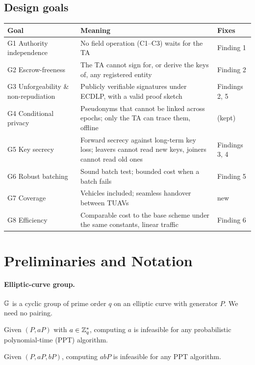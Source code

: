\subsection{Design goals}
\begin{center}\small
\begin{tabularx}{\linewidth}{@{}l>{\raggedright\arraybackslash}X l@{}}
\toprule
Goal & Meaning & Fixes\\
\midrule
G1 Authority independence & No field operation (C1--C3) waits for the TA & Finding 1\\
G2 Escrow-freeness & The TA cannot sign for, or derive the keys of, any registered entity & Finding 2\\
G3 Unforgeability \& non-repudiation & Publicly verifiable signatures under ECDLP, with a valid proof sketch & Findings 2, 5\\
G4 Conditional privacy & Pseudonyms that cannot be linked across epochs; only the TA can trace them, offline & (kept)\\
G5 Key secrecy & Forward secrecy against long-term key loss; leavers cannot read new keys, joiners cannot read old ones & Findings 3, 4\\
G6 Robust batching & Sound batch test; bounded cost when a batch fails & Finding 5\\
G7 Coverage & Vehicles included; seamless handover between TUAVs & new\\
G8 Efficiency & Comparable cost to the base scheme under the same constants, linear traffic & Finding 6\\
\bottomrule
\end{tabularx}
\end{center}

\section{Preliminaries and Notation}\label{sec:prelim}
\paragraph{Elliptic-curve group.} $\mathbb{G}$ is a cyclic group of prime order $q$ on an elliptic curve with generator $P$. We need no pairing.
\begin{definition}[ECDLP]
Given $(P,aP)$ with $a\in\mathbb{Z}_q^{*}$, computing $a$ is infeasible for any probabilistic polynomial-time (PPT) algorithm.
\end{definition}
\begin{definition}[CDH]
Given $(P,aP,bP)$, computing $abP$ is infeasible for any PPT algorithm.
\end{definition}

